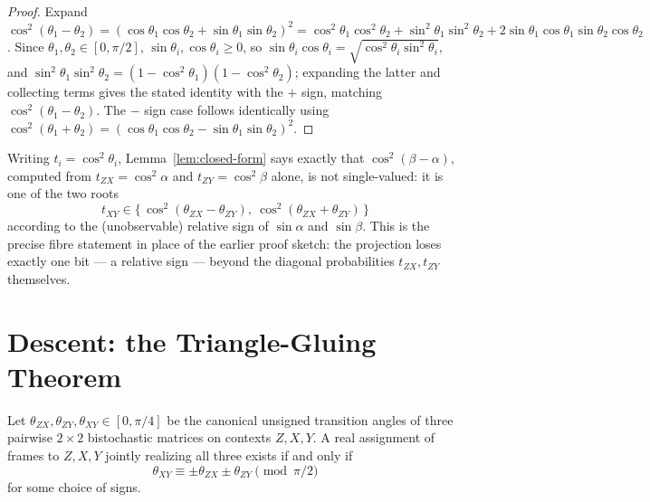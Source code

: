 \begin{proof}
Expand $\cos^2(\theta_1-\theta_2) = (\cos\theta_1\cos\theta_2 +
\sin\theta_1\sin\theta_2)^2 = \cos^2\theta_1\cos^2\theta_2 +
\sin^2\theta_1\sin^2\theta_2 + 2\sin\theta_1\cos\theta_1\sin\theta_2\cos\theta_2$.
Since $\theta_1,\theta_2 \in [0,\pi/2]$, $\sin\theta_i,\cos\theta_i \ge 0$, so
$\sin\theta_i\cos\theta_i = \sqrt{\cos^2\theta_i\sin^2\theta_i}$, and
$\sin^2\theta_1\sin^2\theta_2 = (1-\cos^2\theta_1)(1-\cos^2\theta_2)$; expanding
the latter and collecting terms gives the stated identity with the $+$ sign,
matching $\cos^2(\theta_1-\theta_2)$. The $-$ sign case follows identically
using $\cos^2(\theta_1+\theta_2) = (\cos\theta_1\cos\theta_2 -
\sin\theta_1\sin\theta_2)^2$.
\end{proof}

Writing $t_i = \cos^2\theta_i$, Lemma~\ref{lem:closed-form} says exactly that
$\cos^2(\beta-\alpha)$, computed from $t_{ZX}=\cos^2\alpha$ and
$t_{ZY}=\cos^2\beta$ alone, is not single-valued: it is one of the two roots
\begin{equation}
t_{XY} \in \big\{\, \cos^2(\theta_{ZX}-\theta_{ZY}),\ \cos^2(\theta_{ZX}+\theta_{ZY})
\,\big\}
\end{equation}
according to the (unobservable) relative sign of $\sin\alpha$ and $\sin\beta$.
This is the precise fibre statement in place of the earlier proof sketch: the
projection loses exactly one bit — a relative sign — beyond the diagonal
probabilities $t_{ZX}, t_{ZY}$ themselves.

\section{Descent: the Triangle-Gluing Theorem}

\begin{theorem}
\label{thm:triangle-gluing}
Let $\theta_{ZX},\theta_{ZY},\theta_{XY} \in [0,\pi/4]$ be the canonical
unsigned transition angles of three pairwise $2\times2$ bistochastic matrices
on contexts $Z,X,Y$. A real assignment of frames to $Z,X,Y$ jointly realizing
all three exists if and only if
\begin{equation}
\theta_{XY} \equiv \pm\theta_{ZX} \pm \theta_{ZY} \pmod{\pi/2}
\label{eq:triangle-gluing-relation}
\end{equation}
for some choice of signs.
\end{theorem}

